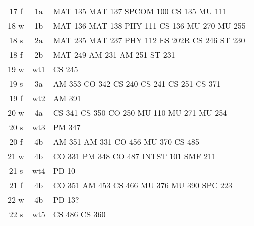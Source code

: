\documentclass[convert]{standalone}
\newcommand{\opw}[1]{{\color{white}#1}}
\begin{document}
\begin{tabular}{|c | c | l |}
	\hline
	17 f & 1a & MAT 135 \quad MAT 137 \quad SPCOM 100 \quad CS 135 \quad MU 111 \\
	18 w & 1b & MAT 136 \quad MAT 138 \quad PHY 111 \quad CS 136 \quad MU 270 \quad MU 255\\
	18 s & 2a & MAT 235 \quad MAT 237 \quad PHY 112 \quad ES 202R \quad CS 246 \quad ST  230 \\
	18 f & 2b & MAT 249 \quad AM 231 \quad AM 251 \quad ST  231 \\
	19 w & wt1 & CS 245 \\
	19 s & 3a & AM 353 \quad CO 342 \quad CS 240 \quad CS 241 \quad CS 251 \quad CS 371 \\
	19 f & wt2 & AM 391 \\
	20 w & 4a & CS 341 \quad CS 350 \quad CO 250  \quad MU 110 \quad MU 271 \quad MU 254 \\
	20 s & wt3 & PM 347 \\
	20 f & 4b & AM 351 \quad AM 331   \quad CO 456 \quad MU 370 \quad CS 485 \\
	21 w & 4b &  CO 331 \quad PM 348  \quad CO 487 \quad  \opw{MU 371}  \quad INTST 101 \quad SMF 211 \\
	21 s & wt4 & PD 10  \\
	21 f & 4b & CO 351  \quad AM 453 \quad CS 466 \quad MU 376 \quad MU 390 \quad SPC 223    \\
	22 w & 4b &  PD 13?\\
	22 s & wt5 & CS 486 \quad CS 360 \\\hline
\end{tabular}
\end{document}
